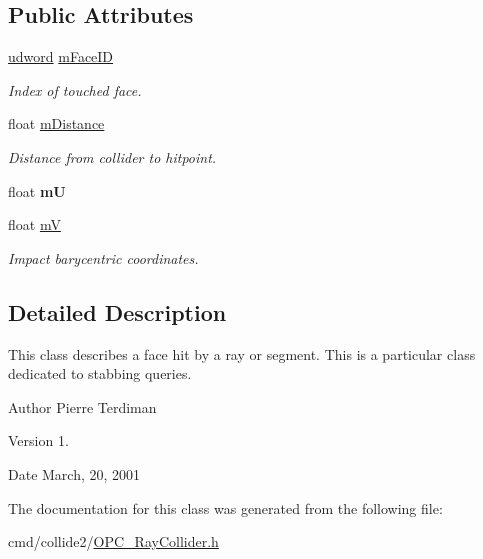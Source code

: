 \subsection*{Public Attributes}
\begin{DoxyCompactItemize}
\item 
\hyperlink{IceTypes_8h_a44c6f1920ba5551225fb534f9d1a1733}{udword} \hyperlink{classCollisionFace_a2699f1cef97a7624e06fdfd12a03a387}{m\+Face\+ID}\hypertarget{classCollisionFace_a2699f1cef97a7624e06fdfd12a03a387}{}\label{classCollisionFace_a2699f1cef97a7624e06fdfd12a03a387}

\begin{DoxyCompactList}\small\item\em Index of touched face. \end{DoxyCompactList}\item 
float \hyperlink{classCollisionFace_a82300f037805abb4a6cf673853162408}{m\+Distance}\hypertarget{classCollisionFace_a82300f037805abb4a6cf673853162408}{}\label{classCollisionFace_a82300f037805abb4a6cf673853162408}

\begin{DoxyCompactList}\small\item\em Distance from collider to hitpoint. \end{DoxyCompactList}\item 
float {\bfseries mU}\hypertarget{classCollisionFace_af85ee469ff2819f0ce67fa51feee61d4}{}\label{classCollisionFace_af85ee469ff2819f0ce67fa51feee61d4}

\item 
float \hyperlink{classCollisionFace_aaf93812d02c2e878a5d35f8f3068881d}{mV}\hypertarget{classCollisionFace_aaf93812d02c2e878a5d35f8f3068881d}{}\label{classCollisionFace_aaf93812d02c2e878a5d35f8f3068881d}

\begin{DoxyCompactList}\small\item\em Impact barycentric coordinates. \end{DoxyCompactList}\end{DoxyCompactItemize}


\subsection{Detailed Description}
This class describes a face hit by a ray or segment. This is a particular class dedicated to stabbing queries.

\begin{DoxyAuthor}{Author}
Pierre Terdiman 
\end{DoxyAuthor}
\begin{DoxyVersion}{Version}
1. 
\end{DoxyVersion}
\begin{DoxyDate}{Date}
March, 20, 2001 
\end{DoxyDate}


The documentation for this class was generated from the following file\+:\begin{DoxyCompactItemize}
\item 
cmd/collide2/\hyperlink{OPC__RayCollider_8h}{O\+P\+C\+\_\+\+Ray\+Collider.\+h}\end{DoxyCompactItemize}
